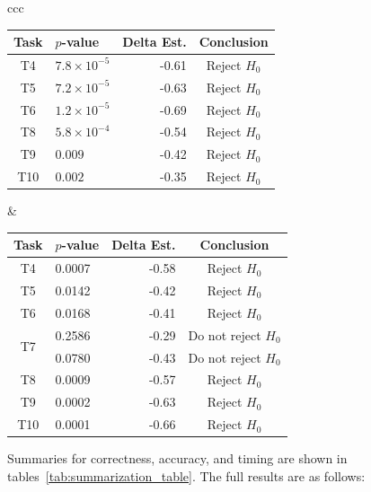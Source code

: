 \begin{table}[htpb]
\begin{tabular}{ccc}
    \begin{tabular}{clrc}
      \toprule
      Task & $p$-value            & Delta Est. & Conclusion\\\midrule
      T4   & $7.8 \times 10^{-5}$ & -0.61      & Reject $H_0$\\
      T5   & $7.2 \times 10^{-5}$ & -0.63      & Reject $H_0$\\
      T6   & $1.2 \times 10^{-5}$ & -0.69      & Reject $H_0$\\
      T8   & $5.8 \times 10^{-4}$ & -0.54      & Reject $H_0$\\
      T9   & $0.009$              & -0.42      & Reject $H_0$\\
      T10  & $0.002$              & -0.35      & Reject $H_0$\\
      \bottomrule
    \end{tabular}
    &
    \begin{tabular}{clrc}
      \toprule
      Task                 & $p$-value & Delta Est. & Conclusion\\\midrule
      T4                   & 0.0007    & -0.58      & Reject $H_0$\\
      T5                   & 0.0142    & -0.42      & Reject $H_0$\\
      T6                   & 0.0168    & -0.41      & Reject $H_0$\\
      \multirow{2}{*}{T7}  & 0.2586    & -0.29      & Do not reject $H_0$\\
                           & 0.0780    & -0.43      & Do not reject $H_0$\\
      T8                   & 0.0009    & -0.57      & Reject $H_0$\\
      T9                   & 0.0002    & -0.63      & Reject $H_0$\\
      T10                  & 0.0001    & -0.66      & Reject $H_0$\\
      \bottomrule
    \end{tabular}
  \end{tabular}
\end{table}

Summaries for correctness, accuracy, and timing are shown in
tables~\ref{tab:summarization_table}.
The full results are as follows:

